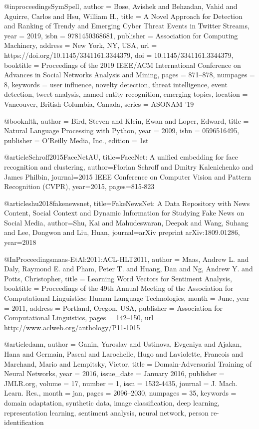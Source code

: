 @inproceedings{SymSpell,
author = {Bose, Avishek and Behzadan, Vahid and Aguirre, Carlos and Hsu, William H.},
title = {A Novel Approach for Detection and Ranking of Trendy and Emerging Cyber Threat Events in Twitter Streams},
year = {2019},
isbn = {9781450368681},
publisher = {Association for Computing Machinery},
address = {New York, NY, USA},
url = {https://doi.org/10.1145/3341161.3344379},
doi = {10.1145/3341161.3344379},
booktitle = {Proceedings of the 2019 IEEE/ACM International Conference on Advances in Social Networks Analysis and Mining},
pages = {871–878},
numpages = {8},
keywords = {user influence, novelty detection, threat intelligence, event detection, tweet analysis, named entity recognition, emerging topics},
location = {Vancouver, British Columbia, Canada},
series = {ASONAM ’19}
}
  


@book{nltk,
author = {Bird, Steven and Klein, Ewan and Loper, Edward},
title = {Natural Language Processing with Python},
year = {2009},
isbn = {0596516495},
publisher = {O’Reilly Media, Inc.},
edition = {1st}
}


@article{Schroff2015FaceNetAU,
  title={FaceNet: A unified embedding for face recognition and clustering},
  author={Florian Schroff and Dmitry Kalenichenko and James Philbin},
  journal={2015 IEEE Conference on Computer Vision and Pattern Recognition (CVPR)},
  year={2015},
  pages={815-823}
}

@article{shu2018fakenewsnet,
  title={FakeNewsNet: A Data Repository with News Content, Social Context and Dynamic Information for Studying Fake News on Social Media},
  author={Shu, Kai and  Mahudeswaran, Deepak and Wang, Suhang and Lee, Dongwon and Liu, Huan},
  journal={arXiv preprint arXiv:1809.01286},
  year={2018}
}


@InProceedings{maas-EtAl:2011:ACL-HLT2011,
  author    = {Maas, Andrew L.  and  Daly, Raymond E.  and  Pham, Peter T.  and  Huang, Dan  and  Ng, Andrew Y.  and  Potts, Christopher},
  title     = {Learning Word Vectors for Sentiment Analysis},
  booktitle = {Proceedings of the 49th Annual Meeting of the Association for Computational Linguistics: Human Language Technologies},
  month     = {June},
  year      = {2011},
  address   = {Portland, Oregon, USA},
  publisher = {Association for Computational Linguistics},
  pages     = {142--150},
  url       = {http://www.aclweb.org/anthology/P11-1015}
}

@article{dann,
author = {Ganin, Yaroslav and Ustinova, Evgeniya and Ajakan, Hana and Germain, Pascal and Larochelle, Hugo and Laviolette, Francois and Marchand, Mario and Lempitsky, Victor},
title = {Domain-Adversarial Training of Neural Networks},
year = {2016},
issue_date = {January 2016},
publisher = {JMLR.org},
volume = {17},
number = {1},
issn = {1532-4435},
journal = {J. Mach. Learn. Res.},
month = jan,
pages = {2096–2030},
numpages = {35},
keywords = {domain adaptation, synthetic data, image classification, deep learning, representation learning, sentiment analysis, neural network, person re-identification}
}


